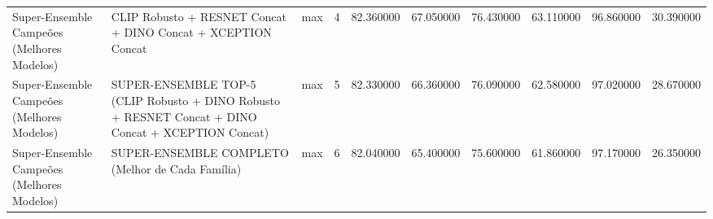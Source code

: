 \begin{table}
\begin{tabular}{lllrrrrrrr}
Super-Ensemble Campeões (Melhores Modelos) & CLIP Robusto + RESNET Concat + DINO Concat + XCEPTION Concat & max & 4 & 82.360000 & 67.050000 & 76.430000 & 63.110000 & 96.860000 & 30.390000 \\
Super-Ensemble Campeões (Melhores Modelos) & SUPER-ENSEMBLE TOP-5 (CLIP Robusto + DINO Robusto + RESNET Concat + DINO Concat + XCEPTION Concat) & max & 5 & 82.330000 & 66.360000 & 76.090000 & 62.580000 & 97.020000 & 28.670000 \\
Super-Ensemble Campeões (Melhores Modelos) & SUPER-ENSEMBLE COMPLETO (Melhor de Cada Família) & max & 6 & 82.040000 & 65.400000 & 75.600000 & 61.860000 & 97.170000 & 26.350000 \\
\bottomrule
\end{tabular}
\end{table}
